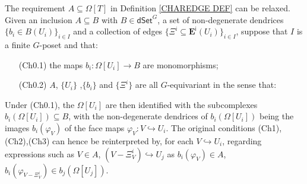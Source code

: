 \documentclass[a4paper,10pt
,draft
]{article}%
\begin{document}
\begin{remark}\label{CHAREDGE2 REM}
The requirement $A \subseteq \Omega[T]$ in Definition \ref{CHAREDGE DEF} can be relaxed.
Given an inclusion $A \subseteq B$ with 
$B \in \mathsf{dSet}^G$,
a set of non-degenerate dendrices
$\{b_i \in B(U_i)\}_{i \in I}$
and a collection of edges
$\{\Xi^i \subseteq \boldsymbol{E}^{\mathsf{i}}(U_i)\}_{i \in I}$, 
suppose that $I$ is a finite $G$-poset and that:
\begin{itemize}
	\item[(Ch0.1)] the maps $b_i \colon \Omega[U_i] \to B$ are monomorphisms;
	\item[(Ch0.2)] $A$, $\{U_i\}$ ,$\{b_i\}$ and $\{\Xi^i\}$
	are all $G$-equivariant in the sense that:
\end{itemize}
Under (Ch0.1),
the $\Omega[U_i]$ are then identified with the subcomplexes $b_i(\Omega[U_i]) \subseteq B$, with the non-degenerate dendrices of $ b_i(\Omega[U_i])$
being the images $b_i(\varphi_V)$ of the face maps $\varphi_V \colon V \hookrightarrow U_i$.
The original conditions (Ch1),(Ch2),(Ch3) can hence be reinterpreted by, 
for each $V \hookrightarrow U_i$, 
regarding expressions such as $V \in A$, 
$(V-\Xi^i_V) \hookrightarrow U_j$
as $b_i(\varphi_V) \in A$, $b_i(\varphi_{V-\Xi^i_V}) \in b_j(\Omega[U_j])$.


\end{remark}
\end{document}
